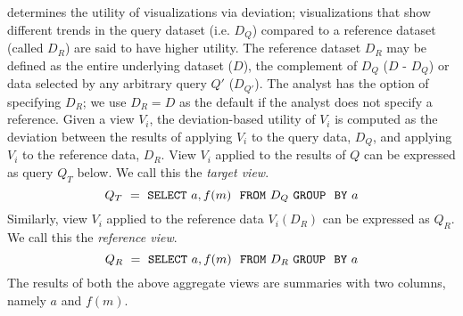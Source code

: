 \SeeDB determines the utility of 
visualizations via deviation; visualizations that show different trends in the query
dataset (i.e. $D_Q$) compared to a reference dataset (called $D_R$) are said to have higher
utility.
The reference dataset $D_R$ may be defined as the entire underlying dataset ($D$),
the complement of $D_Q$ ($D$ - $D_Q$) or data selected by any arbitrary query $Q'$ ($D_{Q'}$).
The analyst has the option of specifying $D_R$; we use $D_R = D$ as the default if the analyst does not specify a reference. 
Given a view $V_i$, the deviation-based utility of $V_i$ is
computed as the deviation between the results of applying $V_i$ to the query data, $D_Q$,
and applying $V_i$ to the reference data, $D_R$.
View $V_i$ applied to the results of $Q$ can be expressed as query $Q_T$ below. 
We call this the {\em target view}.
$$ Q_T\ =\ {\tt SELECT \ } a, f(m) \ \ {\tt FROM} \  D_Q\  {\tt GROUP \ \ BY} \ a$$ 
Similarly, view $V_i$ applied to the reference data $V_i (D_R)$ can be expressed as $Q_R$. 
We call this the {\em reference view}. 
$$ Q_R\ =\ {\tt SELECT \ } a, f(m) \ \ {\tt FROM} \  D_R\  {\tt GROUP \ \ BY} \ a$$
The results of both the above aggregate views are summaries with two columns, namely $a$ and
$f(m)$. 
